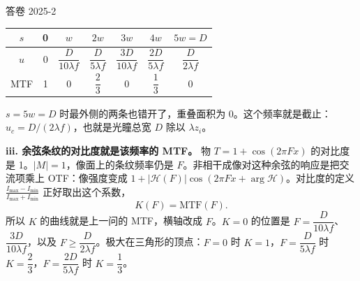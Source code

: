 \begin{exam}{答卷 2025-2}
\begin{center}\renewcommand{\arraystretch}{1.3}
\begin{tabular}{c|cccccc}
$s$ & 0 & $w$ & $2w$ & $3w$ & $4w$ & $5w=D$\\ \hline
$u$ & 0 & $\dfrac{D}{10\lambda f}$ & $\dfrac{D}{5\lambda f}$ & $\dfrac{3D}{10\lambda f}$ & $\dfrac{2D}{5\lambda f}$ & $\dfrac{D}{2\lambda f}$\\
MTF & 1 & 0 & $\dfrac23$ & 0 & $\dfrac13$ & 0
\end{tabular}
\end{center}
$s=5w=D$ 时最外侧的两条也错开了，重叠面积为 0。这个频率就是截止：$u_c=D/(2\lambda f)$，也就是光瞳总宽 $D$ 除以 $\lambda z_i$。

\textbf{iii. 余弦条纹的对比度就是该频率的 MTF。}
物 $T=1+\cos(2\pi Fx)$ 的对比度是 1。$|M|=1$，像面上的条纹频率仍是 $F$。非相干成像对这种余弦的响应是把交流项乘上 OTF：像强度变成 $1+|\mathcal H(F)|\cos(2\pi Fx+\arg\mathcal H)$。对比度的定义 $\frac{I_{\max}-I_{\min}}{I_{\max}+I_{\min}}$ 正好取出这个系数，
\[
K(F)=\mathrm{MTF}(F).
\]
所以 $K$ 的曲线就是上一问的 MTF，横轴改成 $F$。$K=0$ 的位置是 $F=\dfrac{D}{10\lambda f}$、$\dfrac{3D}{10\lambda f}$，以及 $F\ge\dfrac{D}{2\lambda f}$。极大在三角形的顶点：$F=0$ 时 $K=1$，$F=\dfrac{D}{5\lambda f}$ 时 $K=\dfrac23$，$F=\dfrac{2D}{5\lambda f}$ 时 $K=\dfrac13$。
\end{exam}

\begin{center}
\end{center}

